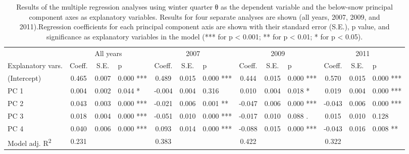 
\begin{sidewaystable}

\centering

\caption{Results of the multiple regression analyses using winter quarter θ as the dependent variable and the below-snow principal component axes as explanatory variables. Results for four separate analyses are shown (all years, 2007, 2009, and 2011).Regression coefficients for each principal component axis are shown with their standard error (S.E.), p value, and significance as explanatory variables in the model (*** for p < 0.001; ** for p < 0.01; * for p < 0.05).\label{reg_winter_theta_t}}

\begin{tabular}{lcclcclcclccl}
\toprule
{} & \multicolumn{3}{c}{All years}& \multicolumn{3}{c}{2007}& \multicolumn{3}{c}{2009}& \multicolumn{3}{c}{2011}\\

\cmidrule(l){2-4} \cmidrule(l){5-7} \cmidrule(l){8-10} \cmidrule(l){11-13}
Explanatory vars. &Coeff. &S.E. &p  &Coeff. &S.E. &p  &Coeff. &S.E. &p  &Coeff. &S.E. &p  \\

\midrule
(Intercept)	&0.465	&0.007	&0.000	***	&0.489	&0.015	&0.000	***	&0.444	&0.015	&0.000	***	&0.570	&0.015	&0.000	***\\
PC 1	&0.004	&0.002	&0.044	*	&-0.004	&0.004	&0.316	&0.010	&0.004	&0.018	*	&0.019	&0.004	&0.000	***\\
PC 2	&0.043	&0.003	&0.000	***	&-0.021	&0.006	&0.001	**	&-0.047	&0.006	&0.000	***	&-0.043	&0.006	&0.000	***\\
PC 3	&0.018	&0.004	&0.000	***	&-0.051	&0.010	&0.000	***	&-0.017	&0.010	&0.088	.	&0.015	&0.010	&0.128	\\
PC 4	&0.040	&0.006	&0.000	***	&0.093	&0.014	&0.000	***	&-0.088	&0.015	&0.000	***	&-0.043	&0.016	&0.008	**\\
Model adj. R\textsuperscript{2}	&0.231 &	&	&	0.383	&	&	&	0.422	&	&	&	0.322	&	&	\\
\bottomrule
\end{tabular}

\end{sidewaystable}
